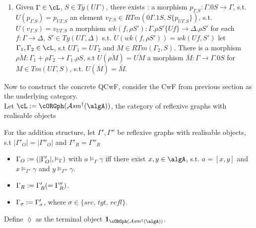 \documentclass[12pt,a4paper]{article}
\def\cAsm{\mathcal{A}\mathit{sm}^\dagger(\algA)}
\renewcommand{\O}{_{O}}\alwaysmath{O}
\newcommand{\R}{\ensuremath{_{R}}}
\def\assembly{assembly$^\dagger$\xspace}
\def\asmrgs{reflexive graphs with realisable objects\xspace}
\begin{document}
\begin{enumerate}[noitemsep]
  \item Given $\Gamma \in \cL$, $S \in Ty(U\Gamma)$, there exists \label{def:qcwf-morphisms}:
  \subitem a morphism $p_{\Gamma.S} : \Gamma. 0S \to \Gamma$, s.t. $U(p_{\Gamma.S})=p_{U\Gamma.S}$
  \subitem an element $v_{\Gamma.S} \in RTm(0\Gamma.1S, S\{p_{U\Gamma.S}\})$, s.t. $U(v_{\Gamma.S})=v_{U\Gamma.S}$
  \subitem a morphism $wk(f, \rho S') : \Gamma.\rho S'\{Uf\} \to \Delta.\rho S'$ for each $f : \Gamma \to \Delta$, $S' \in Ty(U\Gamma, \Delta)$ s.t. $U(wk(f, \rho S'))=wk(Uf, S')$
  \subitem let $\Gamma_1, \Gamma_2 \in \cL$, s.t $U\Gamma_1 = U\Gamma_2$ and $M \in RTm(\Gamma_2, S)$. There is a morphism $\overline{\rho M} : \Gamma_1 + \rho \Gamma_2 \to \Gamma_1 . \rho S$, s.t $U(\overline{\rho M})= \overline{UM}$
  \subitem a morphism $\overline{M} : \Gamma \to \Gamma.0S$ for $M \in Tm(U\Gamma, S)$, s.t. $U(\overline{M})=\overline{M}$.
\end{enumerate}

Now to construct the concrete QCwF, consider the CwF from previous section as the underlying category.\\

Let $\cL := \cORGph(\cAsm)$, the category of \asmrgs%

For the addition structure, let $\Gamma', \Gamma''$ be \asmrgs, s.t  $|\Gamma'\O|=|\Gamma''\O|$ and $\Gamma'\R=\Gamma''\R$ %
\begin{itemize}
    \item $\Gamma\O \define (\carr{\Gamma'\O}, \vDash_\Gamma)$ with $ a \vDash_\Gamma \gamma$ iff there exist $x,y \in \algA$, s.t. $a = [x,y]$ and $x \vDash_{\Gamma'} \gamma$ and $ y \vDash_{\Gamma''} \gamma$.

    \item $\Gamma\R\define \Gamma'\R (=\Gamma''\R)$. %

    \item $\Gamma_\sigma := \Gamma'_\sigma$, where $\sigma \in \{src,\, tgt,\, refl \}$.
\end{itemize}
Define $\lozenge$ as the terminal object $\mathbf{1}_{\cORGph(\cAsm)}$. \\
\end{document}
